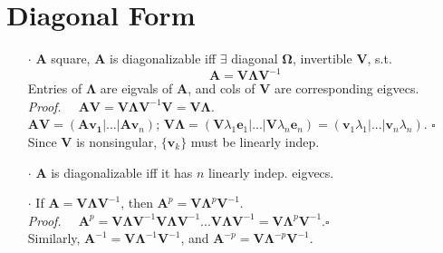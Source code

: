 \documentclass[a4paper, 11pt]{article}
\begin{document}
\section{Diagonal Form}
\begin{itemize}
  \item[$\cdot$] $\pmb{A}$ square, $\pmb{A}$ is diagonalizable iff $\exists$ diagonal $\pmb{\Omega}$, invertible $\pmb{V}$, s.t.
  $$
  \pmb{A} = \pmb{V} \pmb{\Lambda} \pmb{V}^{-1} 
  $$
  Entries of $\pmb{\Lambda}$ are eigvals of $\pmb{A}$, and cols of $\pmb{V}$ are corresponding eigvecs.\\
  \textit{Proof.~~} $\pmb{AV} = \pmb{V} \pmb{\Lambda} \pmb{V}^{-1} \pmb{V}=\pmb{V\Lambda}$. \\
  $\pmb{AV}=(\pmb{A}\pmb{v_1} | ... | \pmb{A}\pmb{v}_n)$; $\pmb{V\Lambda}=(\pmb{V}\lambda_1 \pmb{e}_1|...|\pmb{V}\lambda_n \pmb{e}_n)=(\pmb{v}_1\lambda_1|...|\pmb{v}_n\lambda_n)$. $\square$\\
  Since $\pmb{V}$ is nonsingular, $\{\pmb{v}_k\}$ must be linearly indep.
  \item[$\cdot$] $\pmb{A}$ is diagonalizable iff it has $n$ linearly indep. eigvecs.
  \item[$\cdot$] If $\pmb{A} = \pmb{V} \pmb{\Lambda} \pmb{V}^{-1} $, then $\pmb{A}^p = \pmb{V} \pmb{\Lambda}^p \pmb{V}^{-1} $. \\
  \textit{Proof.~~} $\pmb{A}^p = \pmb{V} \pmb{\Lambda} \pmb{V}^{-1}\pmb{V} \pmb{\Lambda} \pmb{V}^{-1}...\pmb{V} \pmb{\Lambda} \pmb{V}^{-1}=\pmb{V} \pmb{\Lambda}^p \pmb{V}^{-1}$.$\square$\\
  Similarly, $\pmb{A}^{-1}=\pmb{V} \pmb{\Lambda}^{-1} \pmb{V}^{-1} $, and $\pmb{A}^{-p} = \pmb{V} \pmb{\Lambda}^{-p} \pmb{V}^{-1} $.
\end{itemize}
\end{document}
